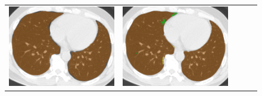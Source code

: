 \begin{figure}[htbp]
\begin{tabular}{ccccc}
\begin{minipage}[c]{.21\textwidth}
      \includegraphics[width=1\textwidth]{images/median/truth/5_0440_20070830_2_407.png}
    \end{minipage} &
    \begin{minipage}[c]{.21\textwidth}
      \centering
      \includegraphics[width=1\textwidth]{images/median/alpha0/5_0440_20070830_2_407.png}
    \end{minipage} &
    \begin{minipage}[c]{.21\textwidth}
      \centering

\end{minipage}
\end{tabular}
\end{figure}
